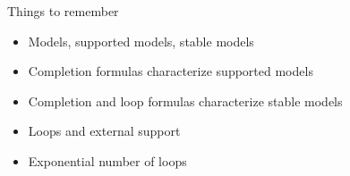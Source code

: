 \begin{frame}{Things to remember}
  \bigskip
  \begin{itemize}
  \item Models, supported models, stable models
    \smallskip
  \item Completion formulas characterize supported models
  \item Completion and loop formulas characterize stable models
    \smallskip
  \item Loops and external support
  \item Exponential number of loops
  \end{itemize}
\end{frame}
%
